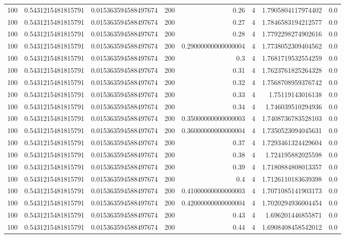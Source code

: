 \documentclass[11pt]{article}
\begin{document}
\begin{center}
\begin{tabular}{rrrrrrrr}
100 & 0.5431215481815791 & 0.015363594588497674 & 200 & 0.26 & 4 & 1.7905804117974402 & 0.0\\
100 & 0.5431215481815791 & 0.015363594588497674 & 200 & 0.27 & 4 & 1.7846583194212577 & 0.0\\
100 & 0.5431215481815791 & 0.015363594588497674 & 200 & 0.28 & 4 & 1.7792298274902616 & 0.0\\
100 & 0.5431215481815791 & 0.015363594588497674 & 200 & 0.29000000000000004 & 4 & 1.7738052309404562 & 0.0\\
100 & 0.5431215481815791 & 0.015363594588497674 & 200 & 0.3 & 4 & 1.7681719532554259 & 0.0\\
100 & 0.5431215481815791 & 0.015363594588497674 & 200 & 0.31 & 4 & 1.7623761825264328 & 0.0\\
100 & 0.5431215481815791 & 0.015363594588497674 & 200 & 0.32 & 4 & 1.7568708959376742 & 0.0\\
100 & 0.5431215481815791 & 0.015363594588497674 & 200 & 0.33 & 4 & 1.75119143016138 & 0.0\\
100 & 0.5431215481815791 & 0.015363594588497674 & 200 & 0.34 & 4 & 1.746039510294936 & 0.0\\
100 & 0.5431215481815791 & 0.015363594588497674 & 200 & 0.35000000000000003 & 4 & 1.7408736783528103 & 0.0\\
100 & 0.5431215481815791 & 0.015363594588497674 & 200 & 0.36000000000000004 & 4 & 1.7350523094045631 & 0.0\\
100 & 0.5431215481815791 & 0.015363594588497674 & 200 & 0.37 & 4 & 1.7293461324429604 & 0.0\\
100 & 0.5431215481815791 & 0.015363594588497674 & 200 & 0.38 & 4 & 1.724195882025598 & 0.0\\
100 & 0.5431215481815791 & 0.015363594588497674 & 200 & 0.39 & 4 & 1.7180884808013357 & 0.0\\
100 & 0.5431215481815791 & 0.015363594588497674 & 200 & 0.4 & 4 & 1.7126110183639398 & 0.0\\
100 & 0.5431215481815791 & 0.015363594588497674 & 200 & 0.41000000000000003 & 4 & 1.7071085141903173 & 0.0\\
100 & 0.5431215481815791 & 0.015363594588497674 & 200 & 0.42000000000000004 & 4 & 1.7020294936004454 & 0.0\\
100 & 0.5431215481815791 & 0.015363594588497674 & 200 & 0.43 & 4 & 1.696201446855871 & 0.0\\
100 & 0.5431215481815791 & 0.015363594588497674 & 200 & 0.44 & 4 & 1.6908408458542012 & 0.0\\

\end{tabular}
\end{center}
\end{document}
